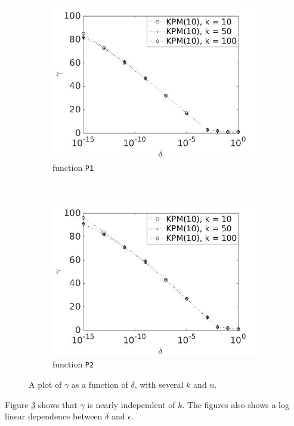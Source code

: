 \begin{figure}[H]
\begin{subfigure}[b]{0.45\textwidth}
                \includegraphics[width=\textwidth]{fig/s20antvstol1k10}
                \caption{function \texttt{P1}}
                \label{fig:gammadeltak3}
        \end{subfigure}
~
        \begin{subfigure}[b]{0.45\textwidth}
                \includegraphics[width=\textwidth]{fig/s21antvstol2k10}
                \caption{ function \texttt{P2}}
                \label{fig:gammadeltak4}
        \end{subfigure}
        \caption{A plot of $\gamma$ as a function of $\delta$, with several $k$ and $n$.} \label{fig:gammadeltak}
\end{figure}
Figure \ref{fig:gammadeltak} shows that $\gamma$ is nearly independent of $k$. The figures also shows a log linear dependence between $\delta$ and $\epsilon$. \\



